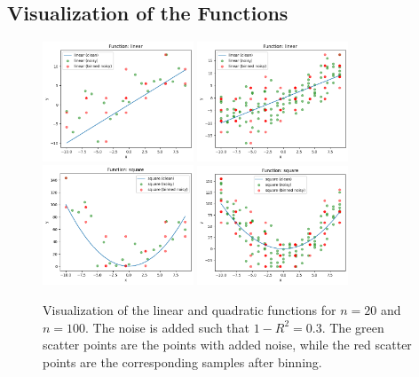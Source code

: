 \documentclass{article}
\begin{document}
\subsection{Visualization of the Functions}
\begin{figure}[h]
    \centering
    \includegraphics[width=0.4\textwidth]{images/linear20.png}
    \includegraphics[width=0.4\textwidth]{images/linear100.png}
    \includegraphics[width=0.4\textwidth]{images/quad20.png}
    \includegraphics[width=0.4\textwidth]{images/quad100.png}
    \caption{Visualization of the linear and quadratic functions for $n=20$ and $n=100$. The noise is added such that $1-R^2=0.3$. The green scatter points are the points with added noise, while the red scatter points are the corresponding samples after binning.}
    \label{fig:funcs}
\end{figure}
\end{document}
